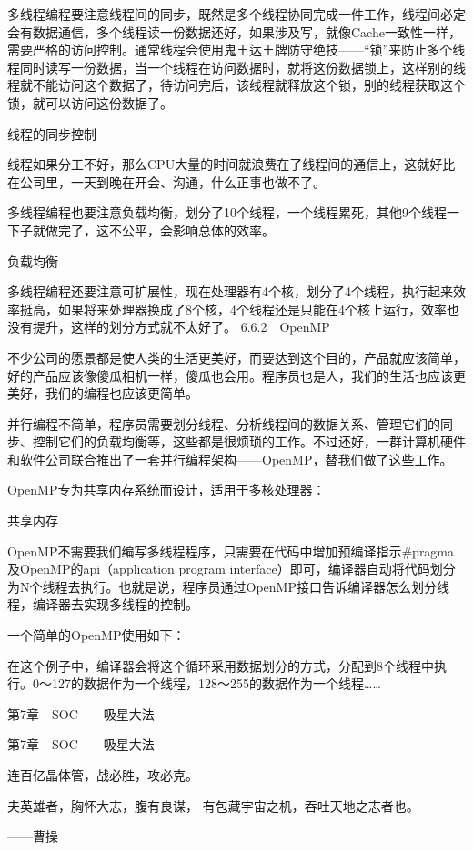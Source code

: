 \documentclass[12pt,UTF8]{ctexbook}
\begin{document}
多线程编程要注意线程间的同步，既然是多个线程协同完成一件工作，线程间必定会有数据通信，多个线程读一份数据还好，如果涉及写，就像Cache一致性一样，需要严格的访问控制。通常线程会使用鬼王达王牌防守绝技——“锁”来防止多个线程同时读写一份数据，当一个线程在访问数据时，就将这份数据锁上，这样别的线程就不能访问这个数据了，待访问完后，该线程就释放这个锁，别的线程获取这个锁，就可以访问这份数据了。

线程的同步控制

线程如果分工不好，那么CPU大量的时间就浪费在了线程间的通信上，这就好比在公司里，一天到晚在开会、沟通，什么正事也做不了。

多线程编程也要注意负载均衡，划分了10个线程，一个线程累死，其他9个线程一下子就做完了，这不公平，会影响总体的效率。

负载均衡

多线程编程还要注意可扩展性，现在处理器有4个核，划分了4个线程，执行起来效率挺高，如果将来处理器换成了8个核，4个线程还是只能在4个核上运行，效率也没有提升，这样的划分方式就不太好了。
6.6.2　OpenMP

不少公司的愿景都是使人类的生活更美好，而要达到这个目的，产品就应该简单，好的产品应该像傻瓜相机一样，傻瓜也会用。程序员也是人，我们的生活也应该更美好，我们的编程也应该更简单。

并行编程不简单，程序员需要划分线程、分析线程间的数据关系、管理它们的同步、控制它们的负载均衡等，这些都是很烦琐的工作。不过还好，一群计算机硬件和软件公司联合推出了一套并行编程架构——OpenMP，替我们做了这些工作。

OpenMP专为共享内存系统而设计，适用于多核处理器：

共享内存

OpenMP不需要我们编写多线程程序，只需要在代码中增加预编译指示\#pragma及OpenMP的api（application program interface）即可，编译器自动将代码划分为N个线程去执行。也就是说，程序员通过OpenMP接口告诉编译器怎么划分线程，编译器去实现多线程的控制。

一个简单的OpenMP使用如下：

在这个例子中，编译器会将这个循环采用数据划分的方式，分配到8个线程中执行。0～127的数据作为一个线程，128～255的数据作为一个线程……


第7章　SOC——吸星大法


第7章　SOC——吸星大法

连百亿晶体管，战必胜，攻必克。

夫英雄者，胸怀大志，腹有良谋，
有包藏宇宙之机，吞吐天地之志者也。

——曹操
\end{document}
